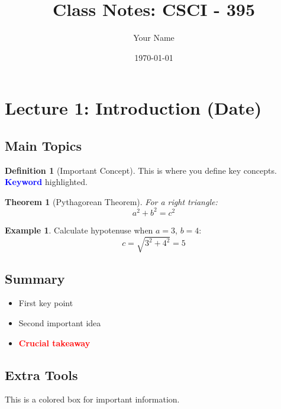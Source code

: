\documentclass[11pt]{article}
\theoremstyle{definition}
\newtheorem{definition}{Definition}[section]
\newtheorem{example}{Example}[section]
\theoremstyle{plain}
\newtheorem{theorem}{Theorem}[section]
\newcommand{\important}[1]{\textcolor{red}{\textbf{#1}}}
\newcommand{\todo}[1]{\marginpar{\textcolor{red}{TODO: #1}}}
\newcommand{\keyterm}[1]{\textbf{\textcolor{blue}{#1}}}
\begin{document}
\title{Class Notes: CSCI - 395}
\author{Your Name}
\date{\today}
\maketitle
\tableofcontents
\newpage

\section{Lecture 1: Introduction (Date)}
\subsection{Main Topics}

\begin{definition}[Important Concept]
This is where you define key concepts. \keyterm{Keyword} highlighted.
\end{definition}

\begin{theorem}[Pythagorean Theorem]
For a right triangle:
\begin{equation}
a^2 + b^2 = c^2
\end{equation}
\end{theorem}


\begin{example}
Calculate hypotenuse when $a=3$, $b=4$:
\begin{equation*}
c = \sqrt{3^2 + 4^2} = 5
\end{equation*}
\end{example}

\subsection{Summary}
\begin{itemize}
\item First key point \todo{Add reference}
\item Second important idea
\item \important{Crucial takeaway}
\end{itemize}

\subsection{Extra Tools}
\begin{tcolorbox}[title=Quick Reference,colback=blue!5!white,colframe=blue!75!black]
This is a colored box for important information.
\end{tcolorbox}
\end{document}

